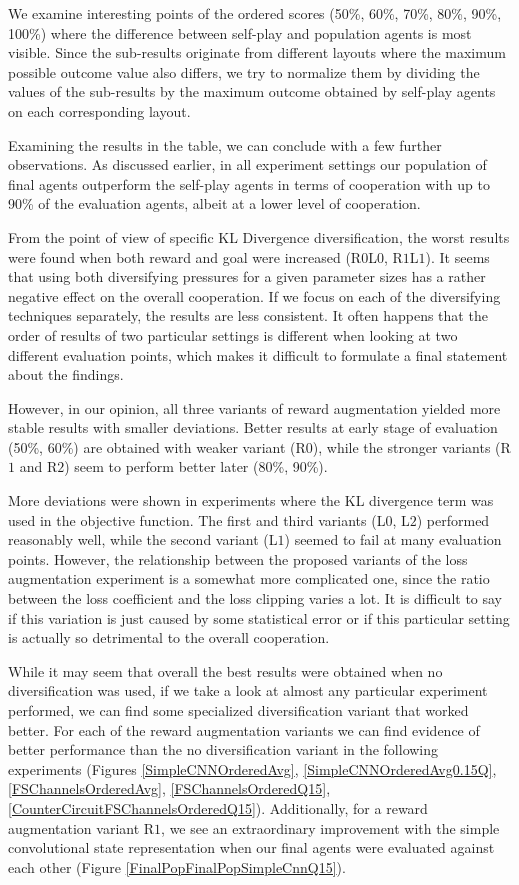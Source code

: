 We examine interesting points of the ordered scores (50\%, 60\%, 70\%, 80\%, 90\%, 100\%) where the difference between self-play and population agents is most visible.
Since the sub-results originate from different layouts where the maximum possible outcome value also differs, we try to normalize them by dividing the values of the sub-results by the maximum outcome obtained by self-play agents on each corresponding layout.

Examining the results in the table, we can conclude with a few further observations.
As discussed earlier, in all experiment settings our population of final agents outperform the self-play agents in terms of cooperation with up to 90\% of the evaluation agents, albeit at a lower level of cooperation.

From the point of view of specific KL Divergence diversification, the worst results were found when both reward and goal were increased (R$0$L$0$, R$1$L$1$).
It seems that using both diversifying pressures for a given parameter sizes has a rather negative effect on the overall cooperation.
If we focus on each of the diversifying techniques separately, the results are less consistent.
It often happens that the order of results of two particular settings is different when looking at two different evaluation points, which makes it difficult to formulate a final statement about the findings.

However, in our opinion, all three variants of reward augmentation yielded more stable results with smaller deviations.
Better results at early stage of evaluation (50\%, 60\%) are obtained with weaker variant (R$0$), while the stronger variants (R$1$ and R$2$) seem to perform better later (80\%, 90\%).


More deviations were shown in experiments where the KL divergence term was used in the objective function.
The first and third variants (L$0$, L$2$) performed reasonably well, while the second variant (L$1$) seemed to fail at many evaluation points.
However, the relationship between the proposed variants of the loss augmentation experiment is a somewhat more complicated one, since the ratio between the loss coefficient and the loss clipping varies a lot. 
It is difficult to say if this variation is just caused by some statistical error or if this particular setting is actually so detrimental to the overall cooperation.

While it may seem that overall the best results were obtained when no diversification was used, if we take a look at almost any particular experiment performed, we can find some specialized diversification variant that worked better.
For each of the reward augmentation variants we can find evidence of better performance than the no diversification variant in the following experiments (Figures \ref{SimpleCNNOrderedAvg}, \ref{SimpleCNNOrderedAvg0.15Q}, \ref{FSChannelsOrderedAvg}, \ref{FSChannelsOrderedQ15}, \ref{CounterCircuitFSChannelsOrderedQ15}).
Additionally, for a reward augmentation variant R$1$, we see an extraordinary improvement with the simple convolutional state representation when our final agents were evaluated against each other (Figure \ref{FinalPopFinalPopSimpleCnnQ15}). 

